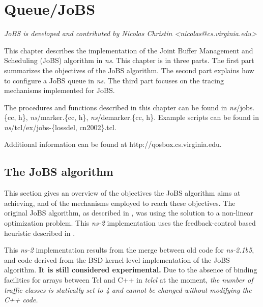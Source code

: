 \section{Queue/JoBS}
\label{sec:jobsx}

\emph{JoBS is developed and contributed by Nicolas Christin <nicolas@cs.virginia.edu>}

This chapter describes the implementation of the Joint Buffer Management 
and Scheduling (JoBS) algorithm in {\em ns}. This chapter is in three parts. 
The first part summarizes the objectives of the JoBS algorithm. The second 
part explains how to configure a JoBS queue in {\em ns}. The third part 
focuses on the tracing mechanisms implemented for JoBS. 

The procedures and functions described in this chapter can be found in 
\emph{ns}/jobs.\{cc, h\}, 
\emph{ns}/marker.\{cc, h\}, 
\emph{ns}/demarker.\{cc, h\}. 
Example scripts can be found 
in \emph{ns}/tcl/ex/jobs-\{lossdel, cn2002\}.tcl. 

\noindent Additional information 
can be found at http://qosbox.cs.virginia.edu.

\subsection{The JoBS algorithm}
This section gives an overview of the objectives the JoBS algorithm
aims at achieving, and of the mechanisms employed to reach these
objectives. The original JoBS algorithm, as described in
\cite{LiCh01}, was using the solution to a non-linear optimization
problem. This {\em ns-2} implementation uses the feedback-control
based heuristic described in \cite{ChLiAb02a}.

This {\em ns-2} implementation results from the 
merge between old code for {\em ns-2.1b5}, and code derived from the 
BSD kernel-level 
implementation of the JoBS algorithm. {\bf It is still considered experimental.}
Due to the absence of binding facilities for arrays 
between Tcl and C++ in {\em tclcl} at the moment, {\em the number of 
traffic classes is 
statically set to 4 and cannot be changed without modifying the C++ code.}

